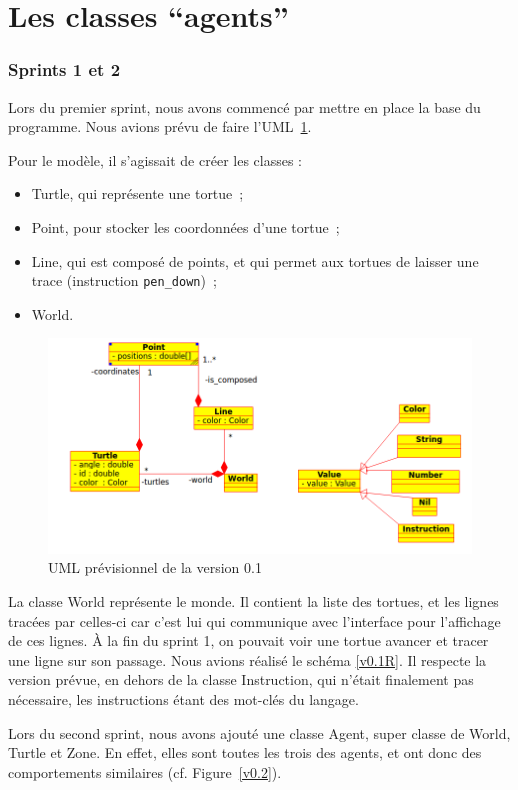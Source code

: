 \section{Les classes \enquote{agents}}
\subsubsection{Sprints 1 et 2}
Lors du premier sprint, nous avons commencé par mettre en place la base du programme. Nous avions prévu de faire l'UML~\ref{v0.1}.

 Pour le modèle, il s'agissait de créer les classes :
\begin{itemize}
\item Turtle, qui représente une tortue~;
\item Point, pour stocker les coordonnées d'une tortue~;
\item Line, qui est composé de points, et qui permet aux tortues de laisser une trace (instruction \verb|pen_down|)~;
\item World.
\end{itemize}


\begin{figure}[h]
\includegraphics[scale=0.5]{doc/report/uml/v01.png}
\caption{\label{v0.1} UML prévisionnel de la version 0.1}
\end{figure}


La classe World représente le monde. Il contient la liste des tortues, et les lignes tracées par celles-ci car c'est lui qui communique avec l'interface pour l'affichage de ces lignes.
À la fin du sprint 1, on pouvait voir une tortue avancer et tracer une ligne sur son passage.
Nous avions réalisé le schéma \ref{v0.1R}. Il respecte la version prévue, en dehors de la classe Instruction, qui n'était finalement pas nécessaire, les instructions étant des mot-clés du langage.

Lors du second sprint, nous avons ajouté une classe Agent, super classe de World, Turtle et Zone. En effet, elles sont toutes les trois des agents, et ont donc des comportements similaires (cf. Figure~\ref{v0.2}).

